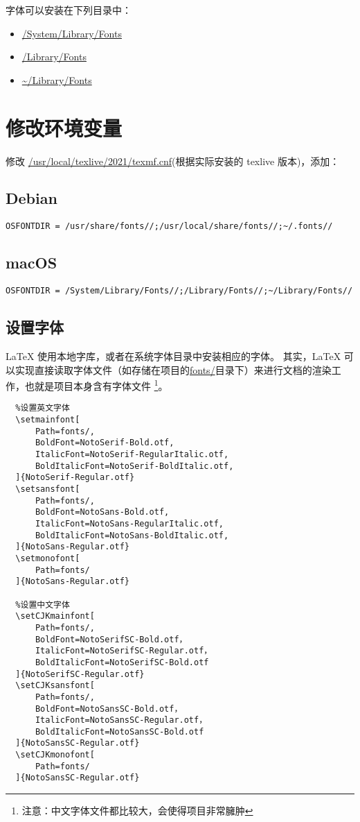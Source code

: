 字体可以安装在下列目录中：

\begin{itemize}
  \item \url{/System/Library/Fonts}
  \item \url{/Library/Fonts}
  \item \url{~/Library/Fonts}
\end{itemize}

\section{修改环境变量 \protect{}}

修改 \url{/usr/local/texlive/2021/texmf.cnf}(根据实际安装的 texlive 版本)，添加：

\subsection{Debian}

\begin{verbatim}
OSFONTDIR = /usr/share/fonts//;/usr/local/share/fonts//;~/.fonts//
\end{verbatim}

\subsection{macOS}

\begin{verbatim}
OSFONTDIR = /System/Library/Fonts//;/Library/Fonts//;~/Library/Fonts//
\end{verbatim}

\subsection{设置字体}

{\LaTeX} 使用本地字库，或者在系统字体目录中安装相应的字体。
其实，{\LaTeX} 可以实现直接读取字体文件（如存储在项目的\url{fonts/}目录下）来进行文档的渲染工作，也就是项目本身含有字体文件
\footnote{注意：中文字体文件都比较大，会使得项目非常臃肿}。

\begin{verbatim}
  %设置英文字体
  \setmainfont[
      Path=fonts/,
      BoldFont=NotoSerif-Bold.otf,
      ItalicFont=NotoSerif-RegularItalic.otf,
      BoldItalicFont=NotoSerif-BoldItalic.otf,
  ]{NotoSerif-Regular.otf}
  \setsansfont[
      Path=fonts/,
      BoldFont=NotoSans-Bold.otf,
      ItalicFont=NotoSans-RegularItalic.otf,
      BoldItalicFont=NotoSans-BoldItalic.otf,
  ]{NotoSans-Regular.otf}
  \setmonofont[
      Path=fonts/
  ]{NotoSans-Regular.otf}
   
  %设置中文字体
  \setCJKmainfont[
      Path=fonts/,
      BoldFont=NotoSerifSC-Bold.otf，
      ItalicFont=NotoSerifSC-Regular.otf，
      BoldItalicFont=NotoSerifSC-Bold.otf
  ]{NotoSerifSC-Regular.otf}
  \setCJKsansfont[
      Path=fonts/,
      BoldFont=NotoSansSC-Bold.otf，
      ItalicFont=NotoSansSC-Regular.otf，
      BoldItalicFont=NotoSansSC-Bold.otf
  ]{NotoSansSC-Regular.otf}
  \setCJKmonofont[
      Path=fonts/
  ]{NotoSansSC-Regular.otf}
\end{verbatim}

